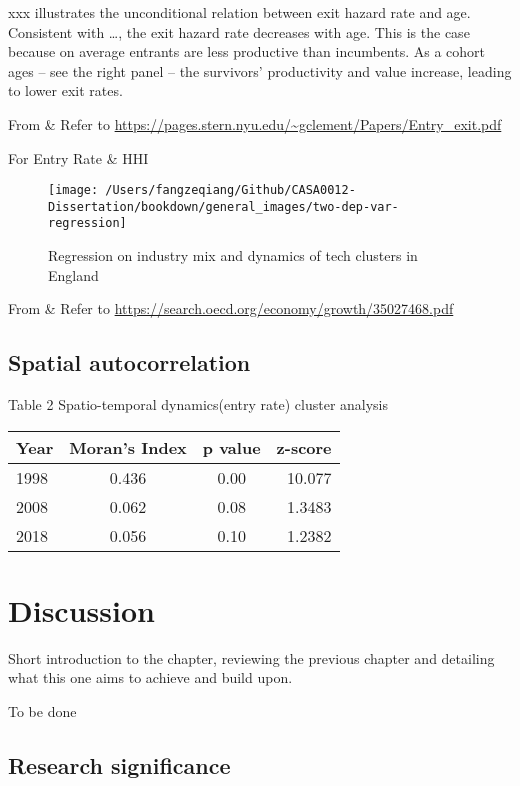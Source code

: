 \documentclass[
  12pt,
  oneside]{book}
\begin{document}
xxx illustrates the unconditional relation between exit hazard rate and age. Consistent with \ldots, the exit hazard rate decreases with age. This is the case because on average entrants are less productive than incumbents. As a cohort ages -- see the right panel -- the survivors' productivity and value increase, leading to lower exit rates.

From \& Refer to \url{https://pages.stern.nyu.edu/~gclement/Papers/Entry_exit.pdf}

For Entry Rate \& HHI

\begin{figure}
\texttt{[image: /Users/fangzeqiang/Github/CASA0012-Dissertation/bookdown/general\_images/two-dep-var-regression]} \caption{Regression on industry mix and  dynamics of tech clusters in England}\label{fig:fig-regression-mix-entry}
\end{figure}

From \& Refer to \url{https://search.oecd.org/economy/growth/35027468.pdf}

\hypertarget{spatial-autocorrelation}{%
\section{Spatial autocorrelation}\label{spatial-autocorrelation}}

Table 2 Spatio-temporal dynamics(entry rate) cluster analysis

\begin{longtable}[]{@{}lccr@{}}
\toprule
Year & Moran's Index & p value & z-score\tabularnewline
\midrule
\endhead
1998 & 0.436 & 0.00 & 10.077\tabularnewline
2008 & 0.062 & 0.08 & 1.3483\tabularnewline
2018 & 0.056 & 0.10 & 1.2382\tabularnewline
\bottomrule
\end{longtable}

\hypertarget{discussion}{%
\chapter{Discussion}\label{discussion}}

Short introduction to the chapter, reviewing the previous chapter and detailing what this one aims to achieve and build upon.

To be done

\hypertarget{research-significance}{%
\section{Research significance}\label{research-significance}}
\end{document}
